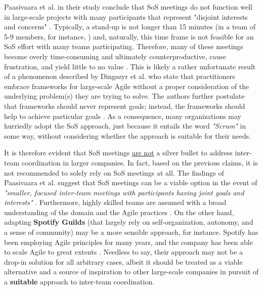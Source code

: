 \documentclass[conference]{IEEEtran}
\begin{document}
Paasivaara et al. in their study conclude that SoS meetings do not function
well in large-scale projects with many participants that represent "disjoint
interests and concerns" \cite{Paasivaara2012}. Typically, a stand-up is not
longer than 15 minutes (in a team of 5-9 members, for instance,
\cite{Schwaber2020}) and, naturally, this time frame is not feasible for an SoS
effort with many teams participating. Therefore, many of these meetings become
overly time-consuming and ultimately counterproductive, cause frustration, and
yield little to no value \cite{Paasivaara2012}. This is likely a rather
unfortunate result of a phenomenon described by Dings\o{}yr et al.
\cite{Dingsoyr2019} who state that practitioners embrace frameworks for
large-scale Agile without a proper consideration of the underlying problem(s)
they are trying to solve. The authors further postulate that frameworks should
never represent goals; instead, the frameworks should help to achieve
particular goals \cite{Dingsoyr2019}. As a consequence, many organizations may
hurriedly adopt the SoS approach, just because it entails the word
\textit{"Scrum"} in some way, without considering whether the approach is
suitable for their needs.

It is therefore evident that SoS meetings \underline{are not} a silver bullet
to address inter-team coordination in larger companies. In fact, based on the
previous claims, it is not recommended to solely rely on SoS meetings at all.
The findings of Paasivaara et al. suggest that SoS meetings can be a viable
option in the event of \textit{"smaller, focused inter-team meetings with
participants having joint goals and interests"} \cite{Paasivaara2012}.
Furthermore, highly skilled teams are assumed with a broad understanding of the
domain and the Agile practices \cite{Sutherland2007}. On the other hand,
adapting \textbf{Spotify Guilds} (that largely rely on self-organization,
autonomy, and a sense of community) \cite{Smite2019} may be a more sensible
approach, for instance. Spotify has been employing Agile principles for many
years, and the company has been able to scale Agile to great extents
\cite{Alqudah2016}. Needless to say, their approach may not be a drop-in
solution for all arbitrary cases, albeit it should be treated as a viable
alternative and a source of inspiration to other large-scale companies in
pursuit of a \textbf{suitable} approach to inter-team coordination.
\end{document}

